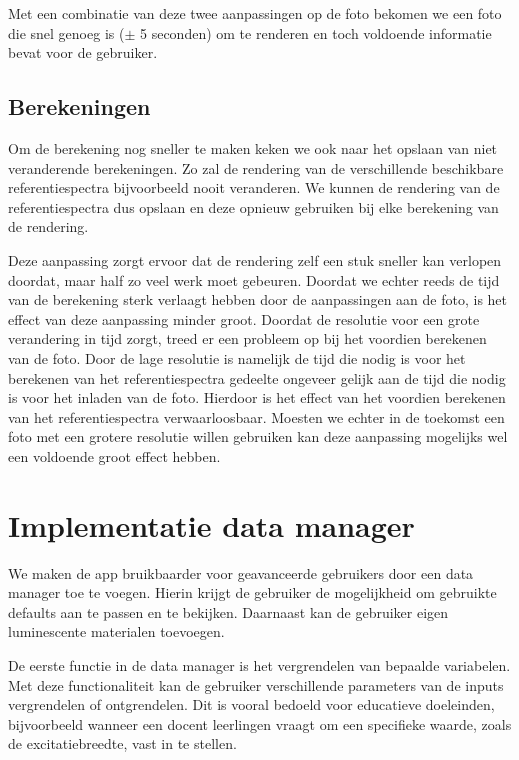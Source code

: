 Met een combinatie van deze twee aanpassingen op de foto bekomen we een foto die snel genoeg is ($\pm$ 5 seconden) om te renderen en toch voldoende informatie bevat voor de gebruiker.

\subsection{Berekeningen}

Om de berekening nog sneller te maken keken we ook naar het opslaan van niet veranderende berekeningen. Zo zal de rendering van de verschillende beschikbare referentiespectra bijvoorbeeld nooit veranderen. We kunnen de rendering van de referentiespectra dus opslaan en deze opnieuw gebruiken bij elke berekening van de rendering.

Deze aanpassing zorgt ervoor dat de rendering zelf een stuk sneller kan verlopen doordat, maar half zo veel werk moet gebeuren. Doordat we echter reeds de tijd van de berekening sterk verlaagt hebben door de aanpassingen aan de foto, is het effect van deze aanpassing minder groot. Doordat de resolutie voor een grote verandering in tijd zorgt, treed er een probleem op bij het voordien berekenen van de foto. Door de lage resolutie is namelijk de tijd die nodig is voor het berekenen van het referentiespectra gedeelte ongeveer gelijk aan de tijd die nodig is voor het inladen van de foto. Hierdoor is het effect van het voordien berekenen van het referentiespectra verwaarloosbaar. Moesten we echter in de toekomst een foto met een grotere resolutie willen gebruiken kan deze aanpassing mogelijks wel een voldoende groot effect hebben.

\section{Implementatie data manager}\label{sec:data_manager}

We maken de app bruikbaarder voor geavanceerde gebruikers door een data manager toe te voegen. Hierin krijgt de gebruiker de mogelijkheid om gebruikte defaults aan te passen en te bekijken. Daarnaast kan de gebruiker eigen luminescente materialen toevoegen.

De eerste functie in de data manager is het vergrendelen van bepaalde variabelen. Met deze functionaliteit kan de gebruiker verschillende parameters van de inputs vergrendelen of ontgrendelen. Dit is vooral bedoeld voor educatieve doeleinden, bijvoorbeeld wanneer een docent leerlingen vraagt om een specifieke waarde, zoals de excitatiebreedte, vast in te stellen.

